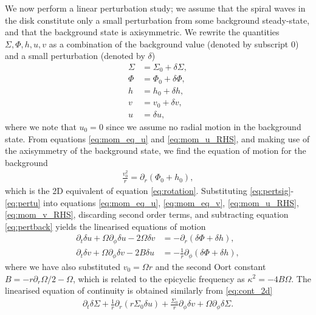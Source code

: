 We now perform a linear perturbation study; we assume that the spiral waves in the disk constitute only a small perturbation from some background steady-state, and that the background state is axisymmetric.
We rewrite the quantities $\Sigma,\Phi,h,u,v$ as a combination of the background value (denoted by subscript 0) and a small perturbation  (denoted by $\delta$)
\begin{align}
    \Sigma &= \Sigma_0 + \delta\Sigma, \label{eq:pertsig} \\
    \Phi &= \Phi_0 + \delta\Phi, \label{eq:pertphi} \\
    h &= h_0 + \delta h, \label{eq:perth} \\
    v &= v_0 + \delta v, \label{eq:pertv} \\ 
    u &= \delta u, \label{eq:pertu}
\end{align}
where we note that $u_0=0$ since we assume no radial motion in the background state.
From equations \ref{eq:mom_eq_u} and \ref{eq:mom_u_RHS}, and making use of the axisymmetry of the background state, we find the equation of motion for the background
\begin{align}
    \frac{v_0^2}{r} = \partial_r \left( \Phi_0 + h_0  \right), \label{eq:pertback}
\end{align}
which is the 2D equivalent of equation \ref{eq:rotation}. 
Substituting \ref{eq:pertsig}-\ref{eq:pertu} into equations \ref{eq:mom_eq_u}, \ref{eq:mom_eq_v}, \ref{eq:mom_u_RHS}, \ref{eq:mom_v_RHS}, discarding second order terms, and subtracting equation \ref{eq:pertback} yields the linearised equations of motion 
\begin{align}
    \partial_t \delta u + \Omega \partial_\phi \delta u - 2 \Omega \delta v &= - \partial_r \left( \delta \Phi + \delta h  \right), \label{eq:mom_u_lin} \\
    \partial_t \delta v + \Omega \partial_\phi \delta v - 2 B \delta u &= - \frac{1}{r} \partial_\phi \left( \delta \Phi + \delta h  \right), \label{eq:mom_v_lin}
\end{align}
where we have also substituted $v_0=\Omega r$ and the second Oort constant $B = -r \partial_r \Omega / 2 -\Omega$, which is related to the epicyclic frequency as $\kappa^2 = -4 B \Omega$. 
The linearised equation of continuity is obtained similarly from \ref{eq:cont_2d}
\begin{align}
    \partial_t \delta \Sigma + \frac{1}{r} \partial_r \left( r \Sigma_0 \delta u  \right) + \frac{\Sigma_0}{r} \partial_\phi \delta v + \Omega \partial_\phi \delta \Sigma. \label{eq:cont_lin}
\end{align}
